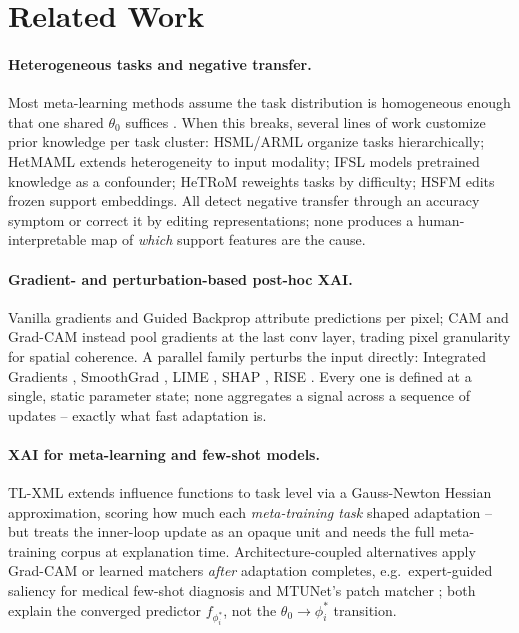\section{Related Work}
\label{sec:related}

\paragraph{Heterogeneous tasks and negative transfer.}
Most meta-learning methods assume the task distribution is homogeneous enough that one shared $\theta_0$ suffices \citep{finn2017model,snell2017prototypical,vinyals2016matching,santoro2016meta}. When this breaks, several lines of work customize prior knowledge per task cluster: HSML/ARML \citep{yao2019hierarchically,yao2020automated} organize tasks hierarchically; HetMAML \citep{chen2021hetmaml} extends heterogeneity to input modality; IFSL \citep{yue2020interventional} models pretrained knowledge as a confounder; HeTRoM \citep{si2025meta} reweights tasks by difficulty; HSFM \citep{parast2026hsfm} edits frozen support embeddings. All detect negative transfer through an accuracy symptom or correct it by editing representations; none produces a human-interpretable map of \emph{which} support features are the cause.

\paragraph{Gradient- and perturbation-based post-hoc XAI.}
Vanilla gradients \citep{simonyan2014visualising} and Guided Backprop \citep{springenberg2014striving} attribute predictions per pixel; CAM \citep{zhou2016learning} and Grad-CAM \citep{selvaraju2020grad} instead pool gradients at the last conv layer, trading pixel granularity for spatial coherence. A parallel family perturbs the input directly: Integrated Gradients \citep{sundararajan2017axiomatic}, SmoothGrad \citep{smilkov2017smoothgrad}, LIME \citep{ribeiro2016lime}, SHAP \citep{lundberg2017unified}, RISE \citep{petsiuk2018rise}. Every one is defined at a single, static parameter state; none aggregates a signal across a sequence of updates -- exactly what fast adaptation is.

\paragraph{XAI for meta-learning and few-shot models.}
TL-XML \citep{mitsuka2025tlxml} extends influence functions to task level via a Gauss-Newton Hessian approximation, scoring how much each \emph{meta-training task} shaped adaptation -- but treats the inner-loop update as an opaque unit and needs the full meta-training corpus at explanation time. Architecture-coupled alternatives apply Grad-CAM or learned matchers \emph{after} adaptation completes, e.g.\ expert-guided saliency for medical few-shot diagnosis \citep{uddin2025expert} and MTUNet's patch matcher \citep{wang2021mtunet}; both explain the converged predictor $f_{\phi_i^*}$, not the $\theta_0\!\to\!\phi_i^*$ transition.

